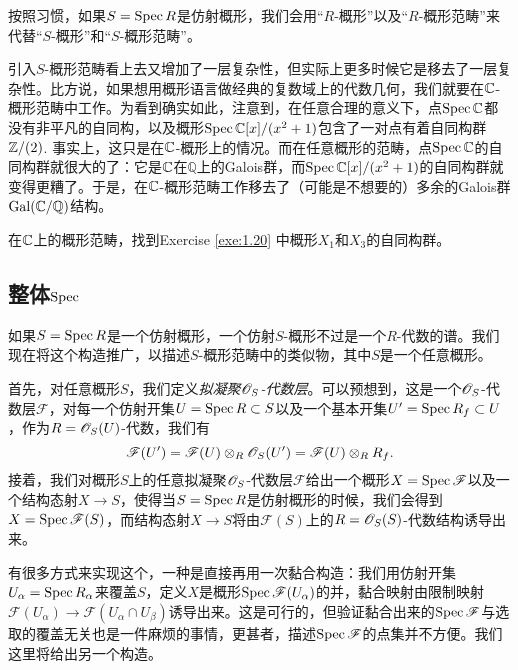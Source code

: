 按照习惯，如果$S=\operatorname{Spec} R$是仿射概形，我们会用“$R$-概形”以及“$R$-概形范畴”来代替“$S$-概形”和“$S$-概形范畴”。

引入$S$-概形范畴看上去又增加了一层复杂性，但实际上更多时候它是移去了一层复杂性。比方说，如果想用概形语言做经典的复数域上的代数几何，我们就要在$\mathbb{C}$-概形范畴中工作。为看到确实如此，注意到，在任意合理的意义下，点$\operatorname{Spec} \mathbb{C}$都没有非平凡的自同构，以及概形$\operatorname{Spec} \mathbb{C}[x]/(x^2+1)$包含了一对点有着自同构群$\mathbb{Z}/(2)$. 事实上，这只是在$\mathbb{C}$-概形上的情况。而在任意概形的范畴，点$\operatorname{Spec} \mathbb{C}$的自同构群就很大的了：它是$\mathbb{C}$在$\mathbb Q$上的Galois群，而$\operatorname{Spec} \mathbb{C}[x]/(x^2+1)$的自同构群就变得更糟了。于是，在$\mathbb{C}$-概形范畴工作移去了（可能是不想要的）多余的Galois群$\mathrm{Gal}(\mathbb{C}/\mathbb Q)$结构。

\begin{exe}\label{exe:1.50}
在$\mathbb{C}$上的概形范畴，找到Exercise \ref{exe:1.20} 中概形$X_1$和$X_3$的自同构群。
\end{exe}

\subsection{整体\texorpdfstring{$\operatorname{Spec}$}{Spec}} \label{s:1.3.3}

如果$S=\operatorname{Spec} R$是一个仿射概形，一个仿射$S$-概形不过是一个$R$-代数的谱。我们现在将这个构造推广，以描述$S$-概形范畴中的类似物，其中$S$是一个任意概形。

首先，对任意概形$S$，我们定义\textit{拟凝聚$\mathscr{O}_S$-代数层}。可以预想到，这是一个$\mathscr{O}_S$-代数层$\mathscr F$，对每一个仿射开集$U=\operatorname{Spec} R\subset S$以及一个基本开集$U'=\operatorname{Spec} R_f\subset U$，作为$R=\mathscr{O}_S(U)$-代数，我们有
\[
	\mathscr F(U')=\mathscr F(U)\otimes_R \mathscr{O}_S(U')=\mathscr F(U)\otimes_R R_f.
\]
接着，我们对概形$S$上的任意拟凝聚$\mathscr{O}_S$-代数层$\mathscr F$给出一个概形$X=\operatorname{Spec} \mathscr F$以及一个结构态射$X\to S$，使得当$S=\operatorname{Spec} R$是仿射概形的时候，我们会得到$X=\operatorname{Spec} \mathscr F(S)$，而结构态射$X\to S$将由$\mathscr F(S)$上的$R=\mathscr{O}_S(S)$-代数结构诱导出来。

有很多方式来实现这个，一种是直接再用一次黏合构造：我们用仿射开集$U_\alpha=\operatorname{Spec} R_\alpha$来覆盖$S$，定义$X$是概形$\operatorname{Spec} \mathscr F(U_\alpha)$的并，黏合映射由限制映射$\mathscr F(U_\alpha)\to \mathscr F(U_\alpha\cap U_\beta)$诱导出来。这是可行的，但验证黏合出来的$\operatorname{Spec} \mathscr F$与选取的覆盖无关也是一件麻烦的事情，更甚者，描述$\operatorname{Spec} \mathscr F$的点集并不方便。我们这里将给出另一个构造。

